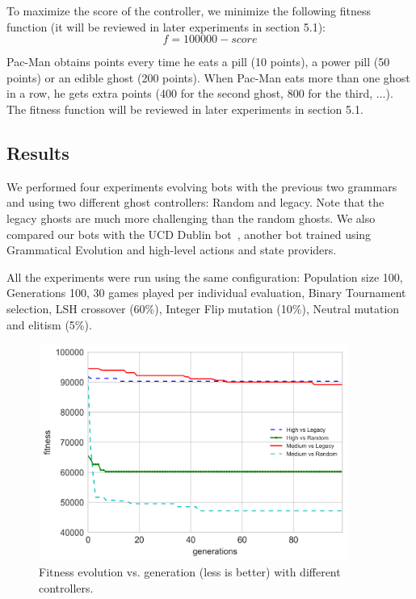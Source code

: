 \documentclass{llncs}
\newcommand{\paco}{Pac-Man }
\begin{document}
To maximize the score of the controller, we minimize the following fitness function (it will be reviewed in later experiments in section 5.1):
\begin{equation*} %
f = 100000 - score
\end{equation*}

\paco obtains points every time he eats a pill (10 points), a power pill (50 points) or an edible ghost (200 points). When \paco eats more than one ghost in a row, he gets extra points (400 for the second ghost, 800 for the third, ...).
The fitness function will be reviewed in later experiments in section 5.1.

\subsection{Results}

We performed four experiments evolving bots with the previous two grammars and using two different ghost controllers: Random and legacy. Note that the legacy ghosts are much more challenging than the random ghosts. We also compared our bots with the UCD Dublin bot~\cite{galvan2010evolving}, another bot trained using Grammatical Evolution and high-level actions and state providers.

All the experiments were run using the same configuration: Population size 100, Generations 100, 30 games played per individual evaluation, Binary Tournament selection, LSH crossover (60\%), Integer Flip mutation (10\%), Neutral mutation and elitism (5\%).


\begin{figure}[tb]
   \centering
    \includegraphics[width=0.9\textwidth]{so_fitness_bests}
    \caption{Fitness evolution vs. generation (less is better) with different controllers.}
    \label{fig:fitness}
\end{figure}
\end{document}
